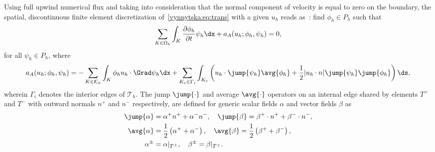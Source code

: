 Using full upwind numerical flux and taking into consideration that
the normal component of velocity is equal to zero on the boundary, the
spatial, discontinuous finite element discretization
of~\eqref{vynnytska:eq:trans} with a given $u_h$ reads
as~\citep{PietroLoForteParolini2006}: find $\phi_h \in P_h$ such that
\begin{equation}
  \sum_{K \in \Omega_h} \int_K \frac{\partial \phi_h}{\partial t} \psi_h
  \dx + a_{A} (u_h; \phi_h, \psi_h) = 0,
\end{equation}
for all $\psi_h \in P_h$, where
\begin{equation}
  \label{vynnytska:eq:dgadv}
   a_{A} (u_h; \phi_h, \psi_h )
   =
   - \sum_{K \in \mathcal{K}_h} \int_K \phi_h u_h \cdot \Grad \psi_h \dx
   + \sum_{K_e \in \Gamma_i} \int_{K_e} \left (
   u_h \cdot \jump{\psi_h} \avg{\phi_h} + \frac{1}{2}
   | u_h \cdot n | \jump{\psi_h} \jump{\phi_h} \right ) \ds,
\end{equation}
wherein $\Gamma_i$ denotes the interior edges of $\mathcal{T}_h$. The
jump $\jump{\cdot}$ and average $\avg{\cdot}$ operators on an internal
edge shared by elements $T^{+}$ and $T^{-}$ with outward normals $n^+$
and $n^-$ respectively, are defined for generic scalar fields $\alpha$
and vector fields $\beta$ as
\begin{align}
  \jump{\alpha}&= \alpha^{+} n^{+} + \alpha^{-} n^{-}, \quad
  \jump{\beta}  = \beta^{+} \cdot n^{+} + \beta^{-} \cdot n^{-}, \\
  \avg{\alpha} &= \frac{1}{2} \left( \alpha^{+} + \alpha^{-} \right), \quad
  \avg{\beta}   = \frac{1}{2} \left( \beta^{+} + \beta^{-} \right), \\
  \alpha^{\pm}  &= \alpha |_{T^{\pm}}, \quad
  \beta^{\pm}    = \beta |_{T^{\pm}}.
\end{align}


